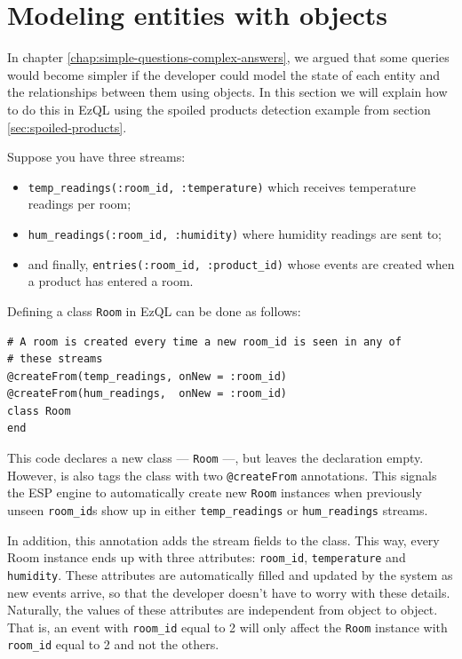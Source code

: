 \documentclass{report}
\begin{document}
\section{Modeling entities with objects}
\label{sec:objects}

In chapter \ref{chap:simple-questions-complex-answers}, we argued that
some queries would become simpler if the developer could model the
state of each entity and the relationships between them using
objects. In this section we will explain how to do this in EzQL using
the spoiled products detection example from section
\ref{sec:spoiled-products}.

Suppose you have three streams:

\begin{itemize}
\item \verb=temp_readings(:room_id, :temperature)= which receives
  temperature readings per room;
\item \verb=hum_readings(:room_id, :humidity)= where humidity readings
  are sent to;
\item and finally, \verb=entries(:room_id, :product_id)= whose events
  are created when a product has entered a room.
\end{itemize}

Defining a class \verb=Room= in EzQL can be done as follows:

\begin{verbatim}
# A room is created every time a new room_id is seen in any of
# these streams
@createFrom(temp_readings, onNew = :room_id)
@createFrom(hum_readings,  onNew = :room_id)
class Room
end
\end{verbatim}

This code declares a new class --- \verb=Room= ---, but leaves the
declaration empty. However, is also tags the class with two
\verb=@createFrom= annotations. This signals the ESP engine to
automatically create new \verb=Room= instances when previously unseen
\verb=room_id=s show up in either \verb=temp_readings= or
\verb=hum_readings= streams.

In addition, this annotation adds the stream fields to
the class. This way, every Room instance ends up with three
attributes: \verb=room_id=, \verb=temperature= and
\verb=humidity=. These attributes are automatically filled and updated
by the system as new events arrive, so that the developer doesn't have
to worry with these details. Naturally, the values of these attributes
are independent from object to object. That is, an event with
\verb=room_id= equal to 2 will only affect the \verb=Room= instance
with \verb=room_id= equal to 2 and not the others.
\end{document}
